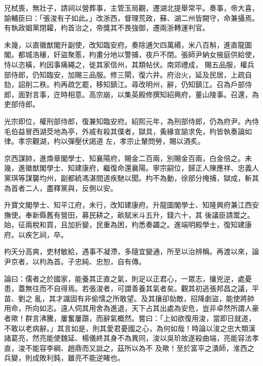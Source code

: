 \begin{pinyinscope}
 兄栻喪，無壯子，請祠以營葬事，主管玉局觀，遷湖北提舉常平。奏事，帝大喜，諭輔臣曰：「張浚有子如此。」改浙西，督理荒政，蘇、湖二州皆闕守，命兼攝焉。有執政姻黨閉糶，枃首治之，帝獎其不畏強御，遷兩浙轉運判官。



 未幾，以直徽猷閣升副使，改知臨安府。奏除逋欠四萬緡，米八百斛，進直龍圖閣。都城浩穰，奸盜聚慝，枃畫分地以警捕，夜戶不閉。張師尹納女掖庭供給使，恃以恣橫，枃因事痛繩之，徙其家信州，其類帖伏。南郊禮成，
 賜五品服，權兵部侍郎，仍知臨安，加賜三品服。修三閘，復六井。府治火，延及民居，上疏自劾，詔削二秩。枃再疏乞罷，移知鎮江。尋改明州，辭，仍知鎮江。召為戶部侍郎，面對言事，迕時相意。高宗崩，以集英殿修撰知紹興府，董山陵事。召還，為吏部侍郎。



 光宗即位，權刑部侍郎，復兼知臨安府。紹熙元年，為刑部侍郎，仍為府尹。內侍毛伯益冒西湖茭地為亭，外戚有殺其僕者，獄具，夤緣宣諭求免，枃皆執奏論如律。孝宗觀湖，枃以彈壓伏謁道
 左，孝宗止輦問勞，賜以酒炙。



 京西謀帥，進煥章閣學士、知襄陽府，賜金二百兩，別賜金百兩，白金倍之。未幾，進徽猷閣學士、知建康府，繼復命還襄陽。寧宗嗣位，歸正人陳應祥、忠義人黨琪等謀襲均州，副都統馮湛間道疾馳以聞。枃不為動，徐部分掩捕，獄成，斬其為首者二人，盡釋黨與，反側以安。



 升寶文閣學士、知平江府，未行，改知建康府。升龍圖閣學士、知隆興府兼江西安撫使。奉新縣舊有營田，募民耕之，畝賦米斗五升，錢六十，其
 後議臣請鬻之。始，征兩稅和買，且加折變，民重為困，枃悉奏蠲之。進端明殿學士，復知建康府。以疾乞祠，卒。



 枃天分高爽，吏材敏給，遇事不凝滯，多隨宜變通，所至以治辨稱。再渡以來，論尹京者，以枃為首。子忠純、忠恕，自有傳。



 論曰：儒者之於國家，能養其正直之氣，則足以正君心，一眾志，攘兇逆，處憂患，蓋無往而不自得焉。若張浚者，可謂善養其氣者矣。觀其初逃張邦昌之議，平苗、劉之
 亂，其才識固有非偷懦之所敢望。及其攘卻勍敵，招降劇盜，能使將帥用命，所向如志。遠人伺其用舍為進退，天下占其出處為安危，豈非卓然所謂人豪者歟！群言沸騰，屢奮屢躓，而辭氣概然。嘗曰：「上如欲復用浚，當即日就道，不敢以老病辭。」其言如是，則其愛君憂國之心，為何如哉！時論以浚之忠大類漢諸葛亮，然亮能使魏延、楊儀終其身不為異同，浚以吳玠故遂殺曲端，亮能容法孝直，浚不能容李綱、趙鼎而又詆之，茲所以為不
 及歟！至於富平之潰師，淮西之兵變，則成敗利鈍，雖亮不能逆睹也。



\end{pinyinscope}